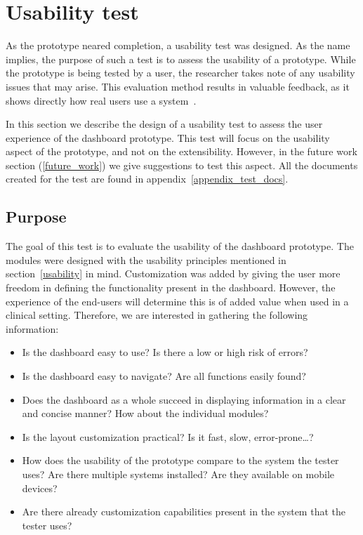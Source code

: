 \section{Usability test}\label{usabilitytest}

As the prototype neared completion, a usability test was designed. As the name implies, the purpose of such a test is to assess the usability of a prototype. While the prototype is being tested by a user, the researcher takes note of any usability issues that may arise. This evaluation method results in valuable feedback, as it shows directly how real users use a system~\cite{Nielsen1993}.

In this section we describe the design of a usability test to assess the user experience of the dashboard prototype. This test will focus on the usability aspect of the prototype, and not on the extensibility. However, in the future work section (\ref{future_work}) we give suggestions to test this aspect. All the documents created for the test are found in appendix~\ref{appendix_test_docs}.

    \subsection{Purpose}

    The goal of this test is to evaluate the usability of the dashboard prototype. The modules were designed with the usability principles mentioned in section~\ref{usability} in mind. Customization was added by giving the user more freedom in defining the functionality present in the dashboard. However, the experience of the end-users will determine this is of added value when used in a clinical setting. Therefore, we are interested in gathering the following information:
    \begin{itemize}
        \item Is the dashboard easy to use? Is there a low or high risk of errors?
        \item Is the dashboard easy to navigate? Are all functions easily found?
        \item Does the dashboard as a whole succeed in displaying information in a clear and concise manner? How about the individual modules?
        \item Is the layout customization practical? Is it fast, slow, error-prone\ldots?
        \item How does the usability of the prototype compare to the system the tester uses? Are there multiple systems installed? Are they available on mobile devices?
        \item Are there already customization capabilities present in the system that the tester uses?
    \end{itemize}


